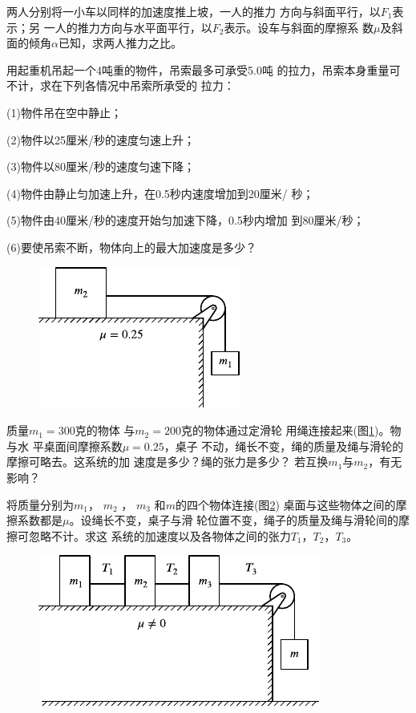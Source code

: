 \begin{exercises}
\exercise 两人分别将一小车以同样的加速度推上坡，一人的推力
方向与斜面平行，以$ F_1 $表示；另
一人的推力方向与水平面平行，以$  F_2  $表示。设车与斜面的摩擦系
数$ \mu $及斜面的倾角$ \alpha $已知，求两人推力之比。

\exercise 用起重机吊起一个4吨重的物件，吊索最多可承受5.0吨
的拉力，吊索本身重量可不计，求在下列各情况中吊索所承受的
拉力：

(1)物件吊在空中静止；

(2)物件以25厘米/秒的速度匀速上升；

(3)物件以80厘米/秒的速度匀速下降；

(4)物件由静止匀加速上升，在0.5秒内速度增加到20厘米/
秒；

(5)物件由40厘米/秒的速度开始匀加速下降，0.5秒内增加
到80厘米/秒；

(6)要使吊索不断，物体向上的最大加速度是多少？

\begin{figure}
  \centering
  \includegraphics{figure/fig03.26}
  \caption{}
  \label{fig:03.26}
\end{figure}
\exercise 质量$  m _ { 1 } = 3 0 0  $克的物体
与$  m _ { 2 } = 2 0 0  $克的物体通过定滑轮
用绳连接起来(图\ref{fig:03.26})。物与水
平桌面间摩擦系数$  \mu = 0 . 2 5  $，桌子
不动，绳长不变，绳的质量及绳与滑轮的摩擦可略去。这系统的加
速度是多少？绳的张力是多少？
若互换$ m_1 $与$ m_2 $，有无影响？

\exercise 将质量分别为$ m_1 $， $ m _ { 2 } $ ， $m _ { 3 }$ 和$ m $的四个物体连接(图\ref{fig:03.27})
桌面与这些物体之间的摩擦系数都是$ \mu $。设绳长不变，桌子与滑
轮位置不变，绳子的质量及绳与滑轮间的摩擦可忽略不计。求这
系统的加速度以及各物体之间的张力$  T _ { 1 }  $，$  T _ { 2 }  $，$  T _ { 3 }  $。
\begin{figure}[h]
  \centering
  \includegraphics{figure/fig03.27}
  \caption{}
  \label{fig:03.27}
\end{figure}


\end{exercises}
